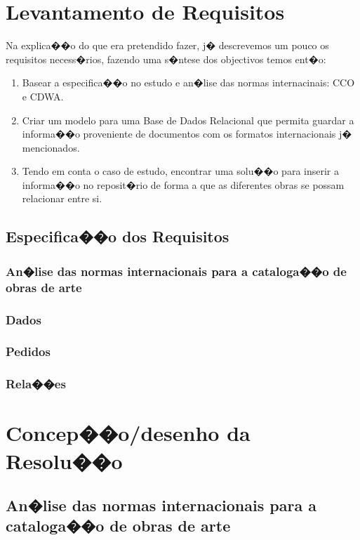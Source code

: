 \documentclass[a4paper,titlepage]{article}
\begin{document}
\section{Levantamento de Requisitos}

Na explica��o do que era pretendido fazer, j� descrevemos um pouco os requisitos necess�rios, fazendo uma s�ntese dos objectivos temos ent�o:
\begin{enumerate}
	\item Basear a especifica��o no estudo e an�lise das normas internacinais: CCO e CDWA.
	\item Criar um modelo para uma Base de Dados Relacional que permita guardar a informa��o proveniente de documentos com os formatos internacionais j� mencionados.
	\item Tendo em conta o caso de estudo, encontrar uma solu��o para inserir a informa��o no reposit�rio de forma a que as diferentes obras se possam relacionar entre si.
\end{enumerate}


\subsection{Especifica��o dos Requisitos}

\subsubsection{An�lise das normas internacionais para a cataloga��o de obras de arte}

\subsubsection{Dados}

\subsubsection{Pedidos}

\subsubsection{Rela��es}

\section{Concep��o/desenho da Resolu��o}
\subsection{An�lise das normas internacionais para a cataloga��o de obras de arte}
\end{document}

